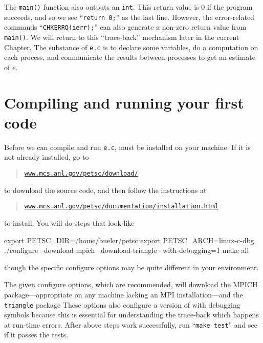 The \texttt{main()} function also outputs an \texttt{int}.  This return value is $0$ if the program succeeds, and so we see ``\texttt{return 0;}'' as the last line.  However, the error-related commands ``\texttt{CHKERRQ(ierr);}'' can also generate a non-zero return value from \texttt{main()}.  We will return to this ``trace-back'' mechanism later in the current Chapter.  The substance of \texttt{e.c} is to declare some variables, do a computation on each process, and communicate the results between processes to get an estimate of $e$.




\section{Compiling and running your first \PETSc code}

Before we can compile and run \texttt{e.c}, \PETSc must be installed on your machine.  If it is not already installed, go to
\begin{quote}
\href{http://www.mcs.anl.gov/petsc/download/index.html}{\texttt{www.mcs.anl.gov/petsc/download/}}
\end{quote}
to download the source code, and then follow the instructions at
\begin{quote}
\href{http://www.mcs.anl.gov/petsc/documentation/installation.html}{\texttt{www.mcs.anl.gov/petsc/documentation/installation.html}}
\end{quote}
to install.  You will do steps that look like
\begin{cline}
export PETSC_DIR=/home/bueler/petsc
export PETSC_ARCH=linux-c-dbg
./configure --download-mpich --download-triangle --with-debugging=1
make all
\end{cline}
though the specific configure options may be quite different in your environment.

The given configure options, which are recommended, will download the MPICH package---appropriate on any machine lacking an MPI installation---and the \texttt{triangle} package  These options also configure a version of \PETSc with debugging symbols because this is essential for understanding the trace-back which happens at run-time errors.  After above steps work successfully, run ``\texttt{make test}'' and see if it passes the tests.

